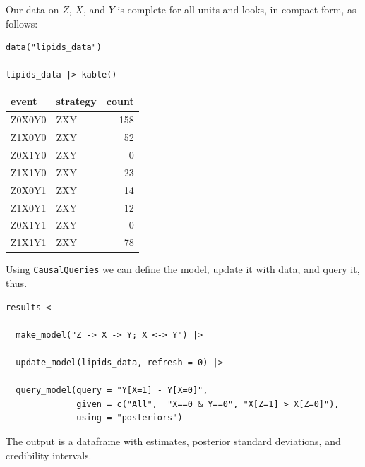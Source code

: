 \documentclass[
  article]{jss}
\begin{document}
Our data on \(Z\), \(X\), and \(Y\) is complete for all units and looks,
in compact form, as follows:

\begin{verbatim}
data("lipids_data")

lipids_data |> kable()
\end{verbatim}

\begin{longtable}[]{@{}llr@{}}
\toprule()
event & strategy & count \\
\midrule()
\endhead
Z0X0Y0 & ZXY & 158 \\
Z1X0Y0 & ZXY & 52 \\
Z0X1Y0 & ZXY & 0 \\
Z1X1Y0 & ZXY & 23 \\
Z0X0Y1 & ZXY & 14 \\
Z1X0Y1 & ZXY & 12 \\
Z0X1Y1 & ZXY & 0 \\
Z1X1Y1 & ZXY & 78 \\
\bottomrule()
\end{longtable}

Using \texttt{CausalQueries} we can define the model, update it with
data, and query it, thus.

\begin{verbatim}
results <- 
  
  make_model("Z -> X -> Y; X <-> Y") |>
  
  update_model(lipids_data, refresh = 0) |>
  
  query_model(query = "Y[X=1] - Y[X=0]",
              given = c("All",  "X==0 & Y==0", "X[Z=1] > X[Z=0]"),
              using = "posteriors") 
\end{verbatim}

The output is a dataframe with estimates, posterior standard deviations,
and credibility intervals.
\end{document}
